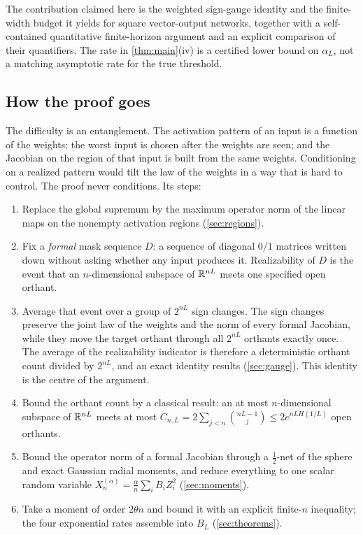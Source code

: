 The contribution claimed here is the weighted sign-gauge identity and the finite-width budget it yields for square vector-output networks, together with a self-contained quantitative finite-horizon argument and an explicit comparison of their quantifiers. The rate in \cref{thm:main}(iv) is a certified lower bound on $\alpha_L$, not a matching asymptotic rate for the true threshold.

\subsection{How the proof goes}

The difficulty is an entanglement. The activation pattern of an input is a function of the weights; the worst input is chosen after the weights are seen; and the Jacobian on the region of that input is built from the same weights. Conditioning on a realized pattern would tilt the law of the weights in a way that is hard to control. The proof never conditions. Its steps:
\begin{enumerate}
\item Replace the global supremum by the maximum operator norm of the linear maps on the nonempty activation regions (\cref{sec:regions}).
\item Fix a \emph{formal} mask sequence $D$: a sequence of diagonal $0/1$ matrices written down without asking whether any input produces it. Realizability of $D$ is the event that an $n$-dimensional subspace of $\mathbb{R}^{nL}$ meets one specified open orthant.
\item Average that event over a group of $2^{nL}$ sign changes. The sign changes preserve the joint law of the weights and the norm of every formal Jacobian, while they move the target orthant through all $2^{nL}$ orthants exactly once. The average of the realizability indicator is therefore a deterministic orthant count divided by $2^{nL}$, and an exact identity results (\cref{sec:gauge}). This identity is the centre of the argument.
\item Bound the orthant count by a classical result: an at most $n$-dimensional subspace of $\mathbb{R}^{nL}$ meets at most $C_{n,L}=2\sum_{j<n}\binom{nL-1}{j}\le 2e^{nLH(1/L)}$ open orthants.
\item Bound the operator norm of a formal Jacobian through a $\tfrac12$-net of the sphere and exact Gaussian radial moments, and reduce everything to one scalar random variable $X_n^{(\alpha)}=\frac{\alpha}{n}\sum_i B_iZ_i^2$ (\cref{sec:moments}).
\item Take a moment of order $2\theta n$ and bound it with an explicit finite-$n$ inequality; the four exponential rates assemble into $B_L$ (\cref{sec:theorems}).
\end{enumerate}
